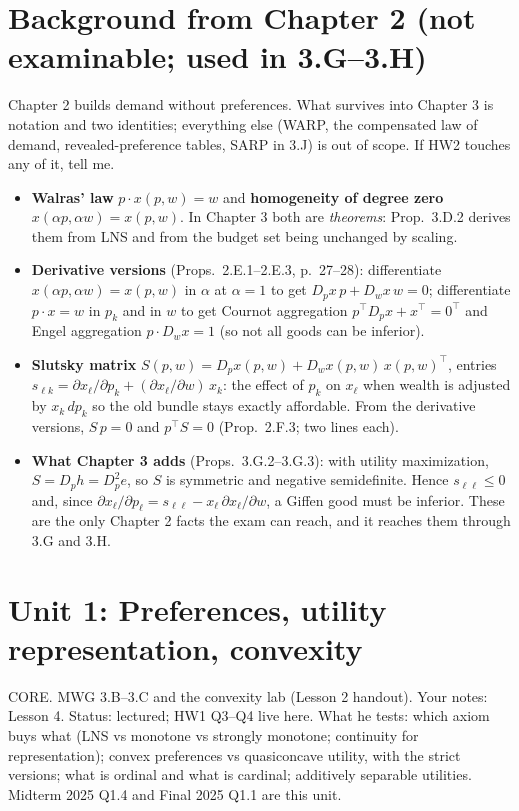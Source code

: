 \documentclass[11pt]{article}
\newcommand{\T}{^{\top}}
\begin{document}
\clearpage
\section*{Background from Chapter 2 (not examinable; used in 3.G--3.H)}\label{sec:ch2}
Chapter 2 builds demand without preferences. What survives into Chapter 3 is notation and two identities; everything else (WARP, the compensated law of demand, revealed-preference tables, SARP in 3.J) is out of scope. If HW2 touches any of it, tell me.
\begin{itemize}
\item \textbf{Walras' law} $p\cdot x(p,w)=w$ and \textbf{homogeneity of degree zero} $x(\alpha p,\alpha w)=x(p,w)$. In Chapter 3 both are \emph{theorems}: Prop.~3.D.2 derives them from LNS and from the budget set being unchanged by scaling.
\item \textbf{Derivative versions} (Props.~2.E.1--2.E.3, p.~27--28): differentiate $x(\alpha p,\alpha w)=x(p,w)$ in $\alpha$ at $\alpha=1$ to get $D_px\,p+D_wx\,w=0$; differentiate $p\cdot x=w$ in $p_k$ and in $w$ to get Cournot aggregation $p\T D_px+x\T=0\T$ and Engel aggregation $p\cdot D_wx=1$ (so not all goods can be inferior).
\item \textbf{Slutsky matrix} $S(p,w)=D_px(p,w)+D_wx(p,w)\,x(p,w)\T$, entries $s_{\ell k}=\partial x_\ell/\partial p_k+(\partial x_\ell/\partial w)\,x_k$: the effect of $p_k$ on $x_\ell$ when wealth is adjusted by $x_k\,dp_k$ so the old bundle stays exactly affordable. From the derivative versions, $S\,p=0$ and $p\T S=0$ (Prop.~2.F.3; two lines each).
\item \textbf{What Chapter 3 adds} (Props.~3.G.2--3.G.3): with utility maximization, $S=D_ph=D^2_pe$, so $S$ is symmetric and negative semidefinite. Hence $s_{\ell\ell}\le0$ and, since $\partial x_\ell/\partial p_\ell=s_{\ell\ell}-x_\ell\,\partial x_\ell/\partial w$, a Giffen good must be inferior. These are the only Chapter 2 facts the exam can reach, and it reaches them through 3.G and 3.H.
\end{itemize}

\clearpage
\section{Unit 1: Preferences, utility representation, convexity}
\begin{unit}{CORE. MWG 3.B--3.C and the convexity lab (Lesson 2 handout). Your notes: Lesson 4. Status: lectured; HW1 Q3--Q4 live here.}
What he tests: which axiom buys what (LNS vs monotone vs strongly monotone; continuity for representation); convex preferences vs quasiconcave utility, with the strict versions; what is ordinal and what is cardinal; additively separable utilities. Midterm 2025 Q1.4 and Final 2025 Q1.1 are this unit.
\end{unit}
\end{document}
